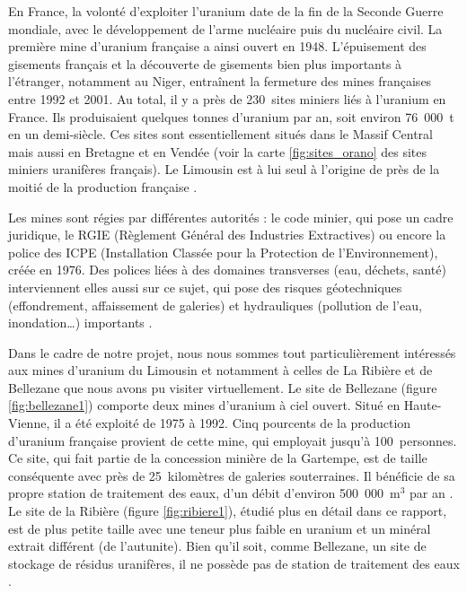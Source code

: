 \documentclass{article}
\begin{document}

En France, la volonté d’exploiter l’uranium date de la fin de la Seconde Guerre mondiale, avec le développement de l'arme nucléaire puis du nucléaire civil. La première mine d’uranium française a ainsi ouvert en 1948. L’épuisement des gisements français et la découverte de gisements bien plus importants à l’étranger, notamment au Niger, entraînent la fermeture des mines françaises entre 1992 et 2001. Au total, il y a près de 230~sites miniers liés à l’uranium en France. Ils produisaient quelques tonnes d'uranium par an, soit environ 76~000~t en un demi-siècle. Ces sites sont essentiellement situés dans le Massif Central mais aussi en Bretagne et en Vendée (voir la carte \ref{fig:sites_orano} des sites miniers uranifères français). Le Limousin est à lui seul à l’origine de près de la moitié de la production française \cite{descostes_introduction_2020}.

Les mines sont régies par différentes autorités : le code minier, qui pose un cadre juridique, le RGIE (Règlement Général des Industries Extractives) ou encore la police des ICPE (Installation Classée pour la Protection de l’Environnement), créée en 1976. Des polices liées à des domaines transverses (eau, déchets, santé) interviennent elles aussi sur ce sujet, qui pose des risques géotechniques (effondrement, affaissement de galeries) et hydrauliques (pollution de l'eau, inondation…) importants \cite{ledoux_notions_2020}\cite{dublineau_gestion_2020}\cite{raimbault_mine_2020}.

Dans le cadre de notre projet, nous nous sommes tout particulièrement intéressés aux mines d'uranium du Limousin et notamment à celles de La Ribière et de Bellezane que nous avons pu visiter virtuellement. Le site de Bellezane (figure \ref{fig:bellezane1}) comporte deux mines d'uranium à ciel ouvert. Situé en Haute-Vienne, il a été exploité de 1975 à 1992. Cinq pourcents de la production d’uranium française provient de cette mine, qui employait jusqu’à 100~personnes. Ce site, qui fait partie de la concession minière de la Gartempe, est de taille conséquente avec près de 25~kilomètres de galeries souterraines. Il bénéficie de sa propre station de traitement des eaux, d'un débit d'environ 500~000~$\text{m}^3$ par an \cite{benesteau_site_2020}. Le site de la Ribière (figure \ref{fig:ribiere1}), étudié plus en détail dans ce rapport, est de plus petite taille avec une teneur plus faible en uranium et un minéral extrait différent (de l’autunite). Bien qu'il soit, comme Bellezane, un site de stockage de résidus uranifères, il ne possède pas de station de traitement des eaux \cite{descostes_introduction_2020}.
\end{document}
